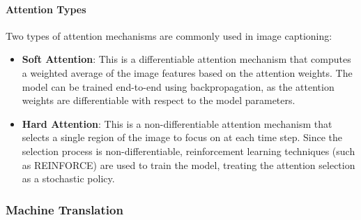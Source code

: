\paragraph{Attention Types}
Two types of attention mechanisms are commonly used in image captioning:
\begin{itemize}
    \item \textbf{Soft Attention}: This is a differentiable attention mechanism that computes a weighted average of the image features based on the attention weights. 
    The model can be trained end-to-end using backpropagation, as the attention weights are differentiable with respect to the model parameters.
    \item \textbf{Hard Attention}: This is a non-differentiable attention mechanism that selects a single region of the image to focus on at each time step.
    Since the selection process is non-differentiable, reinforcement learning techniques (such as REINFORCE) are used to train the model, treating the attention selection as a stochastic policy.
\end{itemize}

\subsubsection{Machine Translation}



